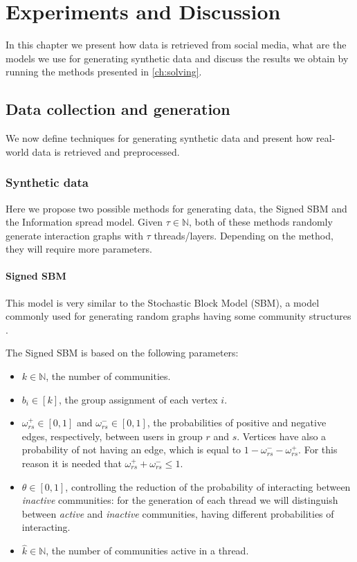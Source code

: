 \chapter{Experiments and Discussion}
\label{ch:resultsAndAnalysis}

In this chapter we present how data is retrieved from social media,
what are the models we use for generating synthetic data and discuss the
results we obtain by running the methods presented in
\autoref{ch:solving}.

\section{Data collection and generation}%
\label{sec:data_collection_and_generation}

We now define techniques for generating synthetic data and present how real-world data is retrieved and preprocessed.

\subsection{Synthetic data}%
\label{sub:synthetic_data}

Here we propose two possible methods for generating data, the Signed SBM and
the Information spread model. Given $\tau \in \mathbb{N}$, both of these methods randomly generate
interaction graphs with $\tau$ threads/layers.
Depending on the method, they will require more parameters.

\subsubsection{Signed SBM}%
\label{ssub:signed_sbm}

This model is very similar to the Stochastic Block Model (SBM), a model
commonly used for generating random graphs having some community structures
\cite{Newman2018}.

The Signed SBM is based on the following parameters:
\begin{itemize}
	\item $k \in \mathbb{N}$, the number of communities.
	\item $b_{i} \in [k]$, the group assignment of each vertex $i$.
	\item $\omega ^{+} _{rs} \in [0, 1]$ and $\omega ^{-} _{rs} \in [0, 1]$, the probabilities
	      of positive and negative edges, respectively, between users in
	      group $r$ and $s$. Vertices have also a probability of not having an
	      edge, which is equal to $1 - \omega ^{-} _{rs} - \omega ^{+} _{rs} $.
	      For this reason it is needed that $\omega ^{+} _{rs} + \omega ^{-} _{rs} \leq 1$.
	\item $\theta \in [0, 1]$, controlling the reduction of the probability of interacting
	      between \emph{inactive} communities: for the generation of each
	      thread we will distinguish between \emph{active} and \emph{inactive}
	      communities, having different probabilities of interacting.
	\item $\hat{k} \in \mathbb{N}$, the number of communities active in
	      a thread.
\end{itemize}

